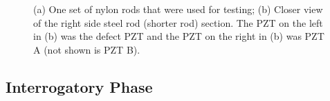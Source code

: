 \begin{figure}
\begin{subfigmatrix}{2}
\end{subfigmatrix}

  \caption
  { \label{fig:nylonTR}
(a) One set of nylon rods that were used for testing;
(b) Closer view of the right side steel rod (shorter rod) section. The PZT on the left in (b) was the defect PZT and the PZT on the right in (b) was PZT A (not shown is PZT B).
}
\end{figure}

\subsection{Interrogatory Phase}

